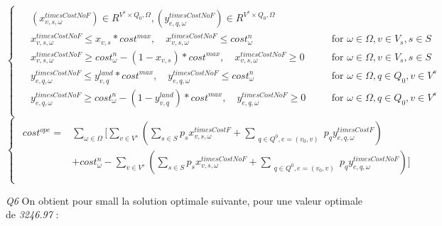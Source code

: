 \documentclass[a4paper,12pt]{article}
\begin{document}
    \begin{equation}
        \begin{cases}
            \begin{alignedat}{2}
                & (x_{v,s,\omega}^{timesCostNoF}) \in R^{V^{s} \times Q_{0}, \Omega}, (y_{e,q,\omega}^{timesCostNoF}) \in R^{V^{s} \times Q_{0}, \Omega} \\
                & x_{v,s,\omega}^{timesCostNoF} \leq x_{v,s}*cost^{max}, \quad x_{v,s,\omega}^{timesCostNoF} \leq cost_{\omega} ^n && \text{for } \omega \in\Omega, v \in V_{s}, s \in S\\
                & x_{v,s,\omega}^{timesCostNoF} \geq cost_{\omega} ^n - (1-x_{v,s})*cost^{max}, \quad x_{v,s,\omega}^{timesCostNoF} \geq 0 && \text{for } \omega \in\Omega, v \in V_{s}, s \in S\\
                & y_{e,q,\omega}^{timesCostNoF} \leq y_{v,q}^{land} * cost^{max}, \quad y_{e,q,\omega}^{timesCostNoF} \leq cost_{\omega} ^n \quad && \text{for } \omega \in \Omega, q \in Q_{0}, v \in V^{s} \\
                & y_{e,q,\omega}^{timesCostNoF} \geq cost_{\omega} ^n -(1-y_{v,q}^{land})*cost^{max}, \quad  y_{e,q,\omega}^{timesCostNoF} \geq 0 \quad && \text{for } \omega \in\Omega, q \in Q_{0}, v \in V^{s}\\
            \end{alignedat}
        \end{cases}
    \end{equation}
    \begin{equation}
        \begin{cases}
            \begin{alignedat}{2}
                cost^{ope} = & \sum_{\omega \in \Omega} \lbrack \sum_{v \in V^s} ( \sum_{s \in S} p_s x_{v,s,\omega}^{timesCostF} + \sum_{\substack{q \in Q^0, e = (v_0, v)}} p_q y_{e,q,\omega}^{timesCostF} ) \\
                &+ cost^n_{\omega} - \sum_{v \in V^s} ( \sum_{s \in S} p_s x_{v,s,\omega}^{timesCostNoF} + \sum_{\substack{q \in Q^{0}, e = (v_0, v)}} p_q y_{e,q,\omega}^{timesCostNoF} ) \rbrack \\ 
            \end{alignedat}
        \end{cases}
    \end{equation}

\textit{Q6}
On obtient pour small la solution optimale suivante, pour une valeur optimale de \textit{3246.97} :
\end{document}
